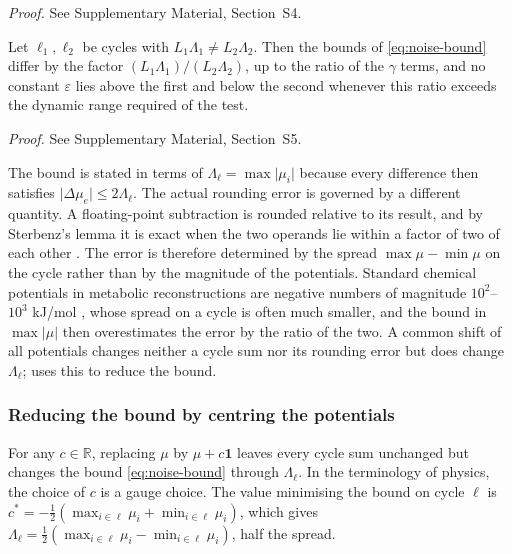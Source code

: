 \documentclass[11pt,a4paper]{article}
\theoremstyle{pstyle}
\theoremstyle{definition}
\theoremstyle{remark}
\newcommand{\R}{\mathbb{R}}
\newcommand{\abs}[1]{\lvert#1\rvert}
\newcommand{\eps}{\varepsilon}
\begin{document}
\noindent\emph{Proof.} See Supplementary Material, Section~S4.

\begin{corollary}
\label{cor:no-constant}
Let $\ell_1,\ell_2$ be cycles with $L_1\Lambda_1 \ne L_2\Lambda_2$. Then
the bounds of \eqref{eq:noise-bound} differ by the factor
$(L_1\Lambda_1)/(L_2\Lambda_2)$, up to the ratio of the $\gamma$ terms,
and no constant $\eps$ lies above the first and below the second
whenever this ratio exceeds the dynamic range required of the test.
\end{corollary}

\noindent\emph{Proof.} See Supplementary Material, Section~S5.

\begin{remark}
\label{rem:lambda}
The bound is stated in terms of $\Lambda_\ell=\max\abs{\mu_i}$ because
every difference then satisfies $\abs{\Delta\mu_e}\le 2\Lambda_\ell$.
The actual rounding error is governed by a different quantity. A
floating-point subtraction is rounded relative to its result, and by
Sterbenz's lemma it is exact when the two operands lie within a factor
of two of each other \citep{goldberg1991,higham2002}. The error is
therefore determined by the spread $\max\mu-\min\mu$ on the cycle rather
than by the magnitude of the potentials. Standard chemical potentials in
metabolic reconstructions are negative numbers of magnitude
$10^{2}$--$10^{3}$ kJ/mol \citep{alberty1998,noor2013}, whose spread on
a cycle is often much smaller, and the bound in $\max\abs{\mu}$ then
overestimates the error by the ratio of the two. A common shift of all
potentials changes neither a cycle sum nor its rounding error but does
change $\Lambda_\ell$;  uses this to reduce the bound.
\end{remark}

\subsubsection{Reducing the bound by centring the potentials}
\label{sec:gauge}

\begin{proposition}
\label{prop:gauge}
For any $c\in\R$, replacing $\mu$ by $\mu + c\mathbf{1}$ leaves every
cycle sum unchanged but changes the bound \eqref{eq:noise-bound}
through $\Lambda_\ell$. In the terminology of physics, the choice of
$c$ is a gauge choice. The value minimising the bound on cycle $\ell$ is
$c^{\ast} = -\tfrac{1}{2}(\max_{i\in\ell}\mu_i + \min_{i\in\ell}\mu_i)$,
which gives $\Lambda_\ell = \tfrac{1}{2}(\max_{i\in\ell}\mu_i -
\min_{i\in\ell}\mu_i)$, half the spread.
\end{proposition}
\end{document}

